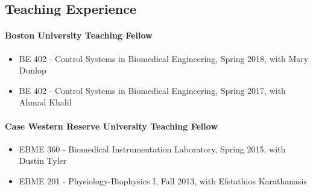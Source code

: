 \documentclass[
  letterpaper,
  DIV=11,
  numbers=noendperiod]{scrartcl}
\let\oldparagraph\paragraph
\renewcommand{\paragraph}[1]{\oldparagraph{#1}\mbox{}}
\providecommand{\tightlist}{%
  \setlength{\itemsep}{0pt}\setlength{\parskip}{0pt}}\usepackage{longtable,booktabs,array}
\begin{document}
\hypertarget{teaching-experience}{%
\subsection{Teaching Experience}\label{teaching-experience}}

\hypertarget{boston-university-teaching-fellow}{%
\paragraph{Boston University Teaching
Fellow}\label{boston-university-teaching-fellow}}

\begin{itemize}
\tightlist
\item
  BE 402 - Control Systems in Biomedical Engineering, Spring 2018, with
  Mary Dunlop
\item
  BE 402 - Control Systems in Biomedical Engineering, Spring 2017, with
  Ahmad Khalil
\end{itemize}

\hypertarget{case-western-reserve-university-teaching-fellow}{%
\paragraph{Case Western Reserve University Teaching
Fellow}\label{case-western-reserve-university-teaching-fellow}}

\begin{itemize}
\tightlist
\item
  EBME 360 - Biomedical Instrumentation Laboratory, Spring 2015, with
  Dustin Tyler
\item
  EBME 201 - Physiology-Biophysics I, Fall 2013, with Efstathios
  Karathanasis
\end{itemize}
\end{document}
